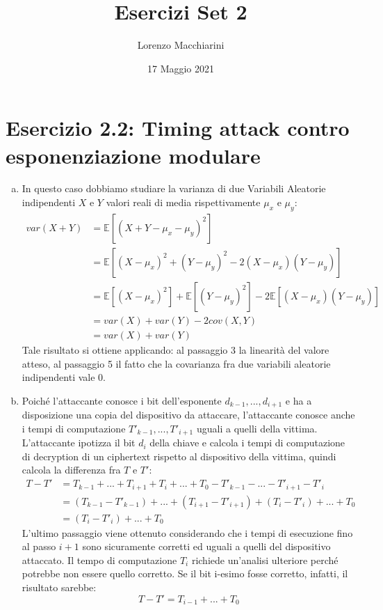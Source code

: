 \documentclass{article}
\title{Esercizi Set 2}
\author{Lorenzo Macchiarini}
\date{17 Maggio 2021}
\begin{document}
\maketitle

\section*{Esercizio 2.2: Timing attack contro esponenziazione modulare}
\begin{enumerate}[(a)]
    \item In questo caso dobbiamo studiare la varianza di due Variabili Aleatorie indipendenti     $X$ e $Y$ valori reali di media rispettivamente $\mu_x$ e $\mu_y$:
        \begin{equation}
        \begin{split}
            var(X+Y) &= \mathbb{E}[(X+Y-\mu_x-\mu_y)^2] \\
                     &= \mathbb{E}[(X-\mu_x)^2 + (Y-\mu_y)^2 -2(X-\mu_x)(Y-\mu_y)] \\ 
                     &= \mathbb{E}[(X-\mu_x)^2] + \mathbb{E}[(Y-\mu_y)^2] -2 \mathbb{E}[(X-\mu_x)(Y-\mu_y)]\\
                     &= var(X) + var(Y) - 2cov(X,Y)\\
                     &= var(X) + var(Y)
        \end{split}
        \end{equation}
        Tale risultato si ottiene applicando: al passaggio 3 la linearità del valore atteso, al passaggio 5 il fatto che la covarianza fra due variabili aleatorie indipendenti vale 0.
        
    \item Poiché l'attaccante conosce i bit dell'esponente $d_{k-1}, ... , d_{i+1}$ e ha a         disposizione una copia del dispositivo da attaccare, l'attaccante conosce anche i tempi     di computazione $T'_{k-1}, ... , T'_{i+1}$ uguali a quelli della vittima. L'attaccante     ipotizza il bit $d_i$ della chiave e calcola i tempi di computazione di decryption di      un ciphertext rispetto al dispositivo della vittima, quindi calcola la differenza fra      $T$ e $T'$:
        \begin{equation}
        \begin{split}
            T-T' &= T_{k-1} + ... + T_{i+1} + T_i + ... + T_0 - T'_{k-1} - ... - T'_{i+1} - T'_i \\
                 &= (T_{k-1} - T'_{k-1}) + ... + (T_{i+1}- T'_{i+1}) + (T_i - T'_i) + ... + T_0 \\
                 &= (T_i - T'_i) + ... + T_0 
        \end{split}
        \end{equation}
        L'ultimo passaggio viene ottenuto considerando che i tempi di esecuzione fino al passo $i+1$ sono sicuramente corretti ed uguali a quelli del dispositivo attaccato. Il tempo di computazione $T_i$ richiede un'analisi ulteriore perché potrebbe non essere quello corretto. Se il bit i-esimo fosse corretto, infatti, il risultato sarebbe:
        \begin{equation}
            T-T' = T_{i-1} + ... + T_0 
        \end{equation}
    

\end{enumerate}
\end{document}
